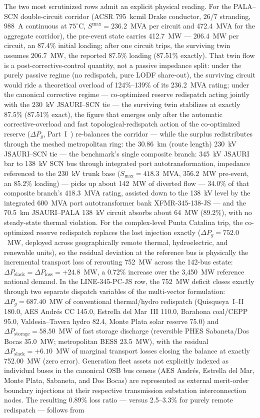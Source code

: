The two most scrutinized rows admit an explicit physical reading. For the PALA--SCN double-circuit corridor (ACSR 795~kcmil Drake conductor, 26/7 stranding, 988~A continuous at $75^{\circ}$C, $S^{\max} = 236.2$~MVA per circuit and 472.4~MVA for the aggregate corridor), the pre-event state carries 412.7~MW --- 206.4~MW per circuit, an 87.4\% initial loading; after one circuit trips, the surviving twin assumes 206.7~MW, the reported 87.5\% loading (87.51\% exactly). That twin flow is a post-corrective-control quantity, not a passive impedance split: under the purely passive regime (no redispatch, pure LODF share-out), the surviving circuit would ride a theoretical overload of 124\%--139\% of its 236.2~MVA rating; under the canonical corrective regime --- co-optimized reserve redispatch acting jointly with the 230~kV JSAURI--SCN tie --- the surviving twin stabilizes at exactly 87.5\% (87.51\% exact), the figure that emerges only after the automatic corrective-overload and fast topological-redispatch action of the co-optimized reserve ($\Delta P_g$, Part~I~\cite{seni142part1}) re-balances the corridor --- while the surplus redistributes through the meshed metropolitan ring: the 30.86~km (route length) 230~kV JSAURI--SCN tie --- the benchmark's single composite branch: 345~kV JSAURI bar to 138~kV SCN bus through integrated port autotransformation, impedance referenced to the 230~kV trunk base ($S_{\max} = 418.3$~MVA, 356.2~MW pre-event, an 85.2\% loading) --- picks up about 142~MW of diverted flow --- 34.0\% of that composite branch's 418.3~MVA rating, assisted down to the 138~kV level by the integrated 600~MVA port autotransformer bank XFMR-345-138-JS --- and the 70.5~km JSAURI--PALA 138~kV circuit absorbs about 64~MW (89.2\%), with no steady-state thermal violation. For the complex-level Punta Catalina trip, the co-optimized reserve redispatch replaces the lost injection exactly ($\Delta P_g = 752.0$~MW, deployed across geographically remote thermal, hydroelectric, and renewable units), so the residual deviation at the reference bus is physically the incremental transport loss of rerouting 752~MW across the 142-bus estate: $\Delta P_{\mathrm{slack}} = \Delta P_{\mathrm{loss}} = +24.8$~MW, a 0.72\% increase over the 3,450~MW reference national demand. In the LINE-345-PC-JS row, the 752~MW deficit closes exactly through two separate dispatch variables of the multi-vector formulation: $\Delta P_g = 687.40$~MW of conventional thermal/hydro redispatch (Quisqueya~I--II 180.0, AES Andr\'es CC 145.0, Estrella del Mar~III 110.0, Barahona coal/CEPP 95.0, Valdesia--Tavera hydro 82.4, Monte Plata solar reserve 75.0) and $\Delta P_{\mathrm{storage}} = 58.50$~MW of fast storage discharge (reversible PHES Sabaneta/Dos Bocas 35.0~MW; metropolitan BESS 23.5~MW), with the residual $\Delta P_{\mathrm{slack}} = +6.10$~MW of marginal transport losses closing the balance at exactly 752.00~MW (zero error). Generation fleet assets not explicitly indexed as individual buses in the canonical OSB bus census (AES Andr\'es, Estrella del Mar, Monte Plata, Sabaneta, and Dos Bocas) are represented as external merit-order boundary injections at their respective transmission substation interconnection nodes. The resulting 0.89\% loss ratio --- versus 2.5--3.3\% for purely remote redispatch --- follows from 